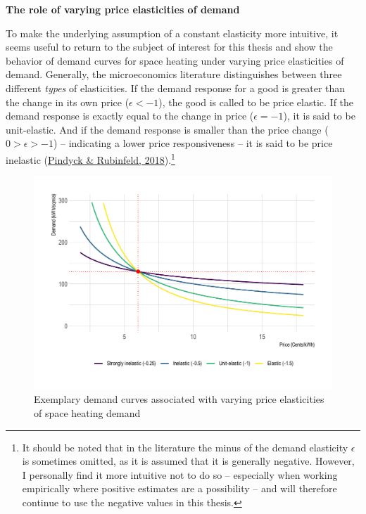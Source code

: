 \documentclass[12pt,twoside]{reedthesis}
\begin{document}
\textbf{The role of varying price elasticities of demand}

To make the underlying assumption of a constant elasticity more intuitive, it seems useful to return to the subject of interest for this thesis and show the behavior of demand curves for space heating under varying price elasticities of demand. Generally, the microeconomics literature distinguishes between three different \emph{types} of elasticities. If the demand response for a good is greater than the change in its own price (\(\epsilon < -1\)), the good is called to be price elastic. If the demand response is exactly equal to the change in price (\(\epsilon = -1\)), it is said to be unit-elastic. And if the demand response is smaller than the price change (\(0 > \epsilon > -1\)) -- indicating a lower price responsiveness -- it is said to be price inelastic (\protect\hyperlink{ref-pindyck_rubinfeld18}{Pindyck \& Rubinfeld, 2018}).\footnote{It should be noted that in the literature the minus of the demand elasticity \(\epsilon\) is sometimes omitted, as it is assumed that it is generally negative. However, I personally find it more intuitive not to do so -- especially when working empirically where positive estimates are a possibility -- and will therefore continue to use the negative values in this thesis.}
\begin{figure}

{\centering \includegraphics[width=1\linewidth]{figure/elasticities_plot} 

}

\caption{Exemplary demand curves associated with varying price elasticities of space heating demand}\label{fig:elasticities-conceptual}
\end{figure}
\end{document}
